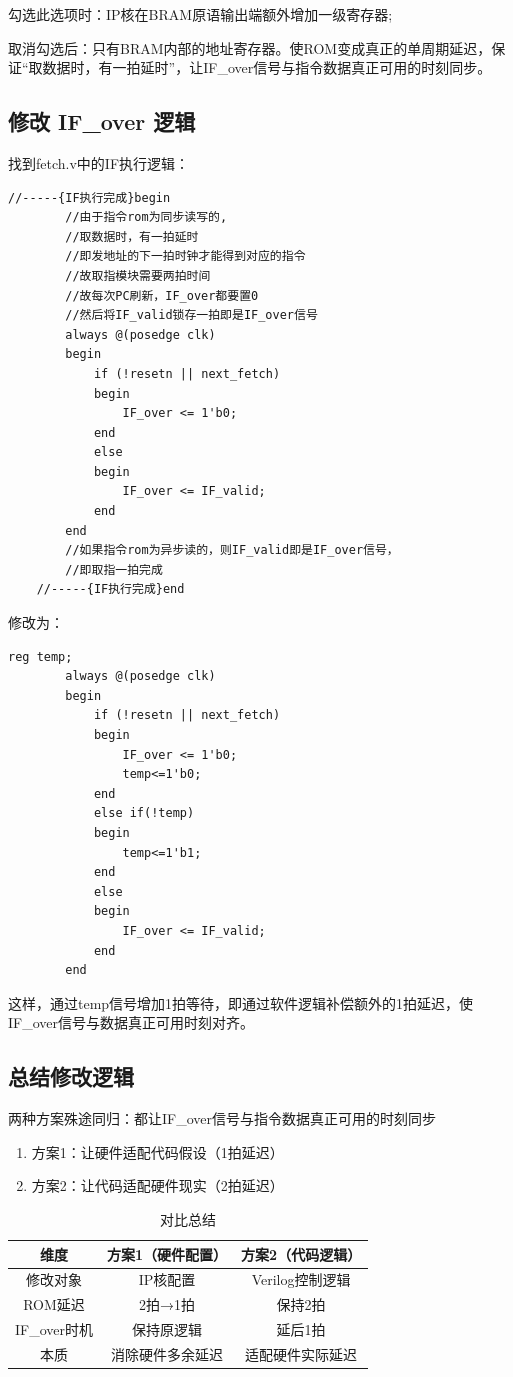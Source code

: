 \documentclass[a4paper]{article}
\begin{document}
	勾选此选项时：IP核在BRAM原语输出端额外增加一级寄存器;
	
	取消勾选后：只有BRAM内部的地址寄存器。使ROM变成真正的单周期延迟，保证“取数据时，有一拍延时”，让IF\_over信号与指令数据真正可用的时刻同步。
	
	\subsection{修改 IF\_over 逻辑}
	找到fetch.v中的IF执行逻辑：
	\begin{lstlisting}[caption={fetch.v-old}]
	//-----{IF执行完成}begin
		//由于指令rom为同步读写的,
		//取数据时，有一拍延时
		//即发地址的下一拍时钟才能得到对应的指令
		//故取指模块需要两拍时间
		//故每次PC刷新，IF_over都要置0
		//然后将IF_valid锁存一拍即是IF_over信号
		always @(posedge clk)
		begin
			if (!resetn || next_fetch)
			begin
				IF_over <= 1'b0;
			end
			else
			begin
				IF_over <= IF_valid;
			end
		end
		//如果指令rom为异步读的，则IF_valid即是IF_over信号，
		//即取指一拍完成
	//-----{IF执行完成}end
	\end{lstlisting}
	修改为：
	\begin{lstlisting}[caption={fetch.v-new}]
		reg temp;
		always @(posedge clk)
		begin
			if (!resetn || next_fetch)
			begin
				IF_over <= 1'b0;
				temp<=1'b0;
			end
			else if(!temp)
			begin
				temp<=1'b1;
			end
			else
			begin
				IF_over <= IF_valid;
			end
		end
	\end{lstlisting}
	这样，通过temp信号增加1拍等待，即通过软件逻辑补偿额外的1拍延迟，使IF\_over信号与数据真正可用时刻对齐。
	
	\subsection{总结修改逻辑}
	
	两种方案殊途同归：都让IF\_over信号与指令数据真正可用的时刻同步
	\begin{enumerate}
		\item 方案1：让硬件适配代码假设（1拍延迟）
		\item 方案2：让代码适配硬件现实（2拍延迟）
	\end{enumerate}
	\begin{table}[!htbp]
		\centering
		\begin{tabular}{ccc}
			\toprule  
			维度& 方案1（硬件配置）& 方案2（代码逻辑）\\
			\midrule
			修改对象& IP核配置& Verilog控制逻辑\\
			ROM延迟& 2拍→1拍& 保持2拍\\
			IF\_over时机& 保持原逻辑& 延后1拍\\
			本质& 消除硬件多余延迟& 适配硬件实际延迟\\
			\bottomrule
		\end{tabular}
		\caption{对比总结}
		\label{table:t1}
	\end{table}
	
\end{document}
